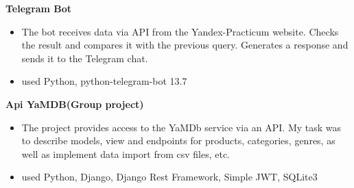 \documentclass{clean_cv}
\begin{document}
   \textbf{Telegram Bot}\href{https://github.com/Chinpakamon/homework_bot}{\color{blue}}
 \begin{itemize}
   \item  The bot receives data via API from the Yandex-Practicum website. Checks the result and compares it with the previous query. Generates a response and sends it to the Telegram chat.
   \item used Python, python-telegram-bot 13.7
   \end{itemize}
   \vspace{0.5cm}
   
   \textbf{Api YaMDB(Group project)}\href{https://github.com/Chinpakamon/api_yamdb/tree/master}{\color{blue}}
 \begin{itemize}
   \item  The project provides access to the YaMDb service via an API. My task was to describe models, view and endpoints for products, categories, genres, as well as implement data import from csv files, etc.
   \item used Python, Django, Django Rest Framework, Simple JWT, SQLite3
   \end{itemize}
\end{document}

